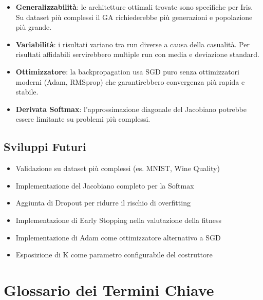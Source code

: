 \documentclass[12pt, a4paper]{article}
\begin{document}
\begin{itemize}
    \item \textbf{Generalizzabilità}: le architetture ottimali trovate sono
          specifiche per Iris. Su dataset più complessi il GA richiederebbe
          più generazioni e popolazione più grande.
    \item \textbf{Variabilità}: i risultati variano tra run diverse a causa
          della casualità. Per risultati affidabili servirebbero multiple run
          con media e deviazione standard.
    \item \textbf{Ottimizzatore}: la backpropagation usa SGD puro senza
          ottimizzatori moderni (Adam, RMSprop) che garantirebbero convergenza
          più rapida e stabile.
    \item \textbf{Derivata Softmax}: l'approssimazione diagonale del Jacobiano
          potrebbe essere limitante su problemi più complessi.
\end{itemize}

\subsection{Sviluppi Futuri}

\begin{itemize}
    \item Validazione su dataset più complessi (es. MNIST, Wine Quality)
    \item Implementazione del Jacobiano completo per la Softmax
    \item Aggiunta di Dropout per ridurre il rischio di overfitting
    \item Implementazione di Early Stopping nella valutazione della fitness
    \item Implementazione di Adam come ottimizzatore alternativo a SGD
    \item Esposizione di K come parametro configurabile del costruttore
\end{itemize}

\newpage

\appendix
\section{Glossario dei Termini Chiave}
\end{document}
